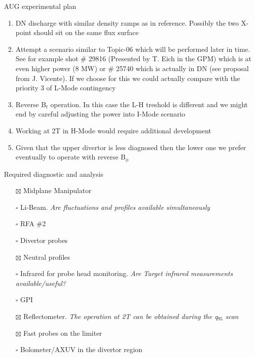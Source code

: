 \documentclass[10pt, compress]{beamer}
\begin{document}
\begin{frame}{AUG experimental plan}
{\begin{enumerate}
{   transport}
    \item \textcolor{ta3chameleon}{DN discharge with similar density ramps as in reference. Possibly the two X-point should
   sit on the same flux surface}
   \item \textcolor{ta3scarletred}{Attempt a scenario similar to Topic-06 which will be performed later in time. See for example
   shot \# 29816 (Presented by T. Eich in the GPM) which is at even
   higher power (8 MW) or \# 25740
   which is actually in DN (see proposal from J. Vicente). If we choose for this we could actually compare with the priority 3 of L-Mode
   contingency}
 \item \textcolor{ta3scarletred}{Reverse B$_{t}$ operation. In this case the L-H treshold is different and we might end
     by careful adjusting the power into I-Mode scenario}
   \item \textcolor{ta3skyblue}{Working at 2T in H-Mode would require
       additional development}
   \item \textcolor{ta3skyblue}{Given that the upper divertor is less
       diagnosed then the lower one we prefer eventually to operate
       with reverse B$_{\phi}$}
   
\end{enumerate}
  }
\end{frame}
\begin{frame}{Required diagnostic and analysis}
  \begin{itemize}
    \item[$\boxtimes$] Midplane Manipulator
    \item[$\square$] Li-Beam. \emph{Are fluctuations and profiles
        available simultaneously}
    \item[$\square$] RFA \#2
    \item[$\square$] Divertor probes
    \item[$\boxtimes$] Neutral profiles
    \item[$\square$] Infrared for probe head monitoring. \emph{Are Target
      infrared measurements available/useful?}
    \item[$\square$] GPI
    \item[$\boxtimes$] Reflectometer. \emph{The operation at 2T can be
      obtained during the q$_{95}$ scan}
    \item[$\boxtimes$] Fast probes on the limiter
    \item[$\square$] Bolometer/AXUV in the divertor region
  \end{itemize}
\end{frame}
\end{document}
